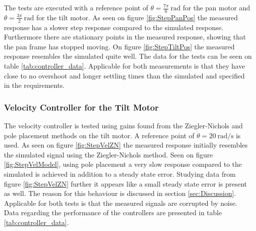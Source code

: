 \documentclass[../../main.tex]{subfiles}
\begin{document}
The tests are executed with a reference point of $\theta = \frac{7\pi}{6}\SI{}{\radian}$ for the pan motor and $\theta = \frac{3\pi}{2}\SI{}{\radian}$ for the tilt motor. As seen on figure \ref{fig:StepPanPos} the measured response has a slower step response compared to the simulated response. Furthermore there are stationary points in the measured response, showing that the pan frame has stopped moving. On figure \ref{fig:StepTiltPos} the measured response resembles the simulated quite well. The data for the tests can be seen on table \ref{tab:controller_data}. Applicable for both measurements is that they have close to no overshoot and longer settling times than the simulated and specified in the requirements. 


\subsubsection*{Velocity Controller for the Tilt Motor}
The velocity controller is tested using gains found from the Ziegler-Nichols and pole placement methods on the tilt motor. A reference point of $\Dot{\theta}=\SI{20}{\radian \per \second}$ is used. As seen on figure \ref{fig:StepVelZN} the measured response initially resembles the simulated signal using the Ziegler-Nichols method. Seen on figure \ref{fig:StepVelModel}, using pole placement a very slow response compared to the simulated is achieved in addition to a steady state error. Studying data from figure \ref{fig:StepVelZN} further it appears like a small steady state error is present as well. The reason for this behaviour is discussed in section \ref{sec:Discussion}. Applicable for both tests is that the measured signals are corrupted by noise. Data regarding the performance of the controllers are presented in table \ref{tab:controller_data}.
\end{document}
